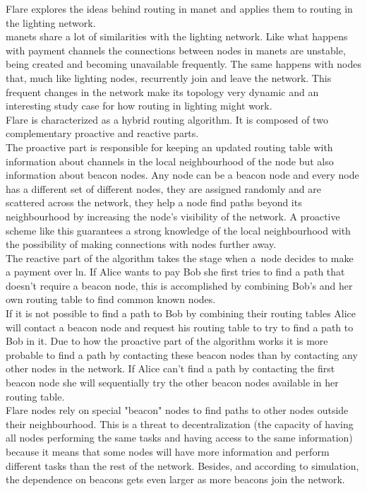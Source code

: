 Flare \cite{flare} explores the ideas behind routing in \acrfull{manet} and applies them to routing in the lighting network.\\
\acrshort{manet}s share a lot of similarities with the lighting network. Like what happens with payment channels the connections between nodes in \acrshort{manet}s are unstable, being created and becoming unavailable frequently. The same happens with nodes that, much like lighting nodes, recurrently join and leave the network. This frequent changes in the network make its topology very dynamic and an interesting study case for how routing in lighting might work. \\
Flare is characterized as a hybrid routing algorithm. It is composed of two complementary proactive and reactive parts.\\
The proactive part is responsible for keeping an updated routing table with information about channels in the local neighbourhood of the node but also information about beacon nodes. Any node can be a beacon node and every node has a different set of different nodes, they are assigned randomly and are scattered across the network, they help a node find paths beyond its neighbourhood by increasing the node's visibility of the network. A proactive scheme like this guarantees a strong knowledge of the local neighbourhood with the possibility of making connections with nodes further away. \\ 
The reactive part of the algorithm takes the stage when a~node decides to make a payment over \acrshort{ln}. If Alice wants to pay Bob she first tries to find a path that doesn't require a beacon node, this is accomplished by combining Bob's and her own routing table to find common known nodes. \\
If it is not possible to find a path to Bob by combining their routing tables Alice will contact a beacon node and request his routing table to try to find a path to Bob in it. Due to how the proactive part of the algorithm works it is more probable to find a path by contacting these beacon nodes than by contacting any other nodes in the network. If Alice can't find a path by contacting the first beacon node she will sequentially try the other beacon nodes available in her routing table.\\
Flare nodes rely on special "beacon" nodes to find paths to other nodes outside their neighbourhood. This is a threat to decentralization (the capacity of having all nodes performing the same tasks and having access to the same information) because it means that some nodes will have more information and perform different tasks than the rest of the network. Besides, and according to simulation, the dependence on beacons gets even larger as more beacons join the network. \\
